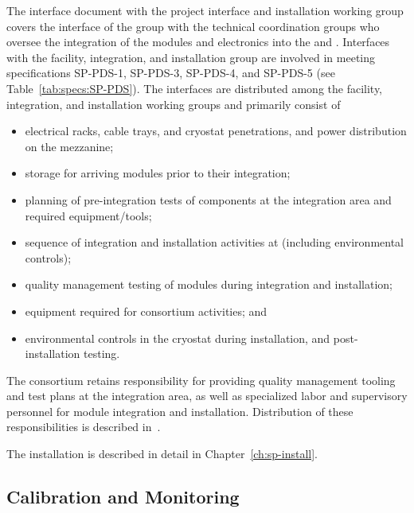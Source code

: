 The interface document with the project interface and installation working group covers the interface of the  group with the technical coordination groups who oversee the integration of the  modules and electronics into the  and . Interfaces with the facility, integration, and installation group are involved in meeting specifications SP-PDS-1, SP-PDS-3, SP-PDS-4, and SP-PDS-5 (see Table~\ref{tab:specs:SP-PDS}).  The interfaces are distributed among the facility, integration, and installation working groups and primarily consist of
\begin{itemize}
    \item electrical racks, cable trays, and cryostat penetrations, and power distribution on the mezzanine;
    \item storage for arriving  modules prior to their integration;
    \item planning of pre-integration tests of  components at the integration area and required equipment/tools;
    \item sequence of integration and installation activities at  (including environmental controls);
    \item quality management testing of  modules during integration and installation;
    \item equipment required for  consortium activities; and
    \item environmental controls in the cryostat during installation, and post-installation testing.
\end{itemize}

The  consortium retains responsibility for providing quality management tooling and test plans at the integration area, as well as specialized labor and supervisory personnel for  module integration and installation. Distribution of these responsibilities is described in~. %

The installation is described in detail in Chapter~\ref{ch:sp-install}.


\subsection{Calibration and Monitoring}
\label{sec:fdsp-pd-intfc-calib}

